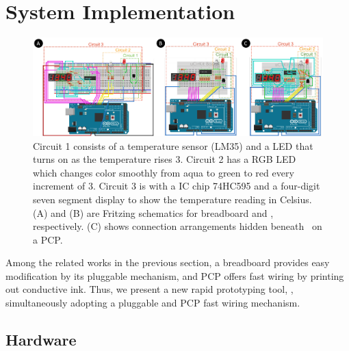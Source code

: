 \section{System Implementation}

\begin{figure}[t]
 \begin{center}
  \includegraphics[width=2\columnwidth]{figures/Fritzing_Schematics_v3.pdf}
  \caption{
    Circuit 1 consists of a temperature sensor (LM35) and a LED that turns on as the temperature rises 3\textcelsius.
    Circuit 2 has a RGB LED which changes color smoothly from aqua to green to red every increment of 3\textcelsius.
    Circuit 3 is with a IC chip 74HC595 and a four-digit seven segment display  to show the temperature reading in Celsius.
    (A) and (B) are Fritzing schematics for breadboard and \papertitle, respectively. (C) shows connection arrangements hidden beneath \papertitle\ on a PCP.
  }
  \label{fig:Chosen_Circuits}
  \end{center}
\end{figure}


Among the related works in the previous section, a breadboard provides easy modification by its pluggable mechanism, and PCP offers fast wiring by printing out conductive ink. Thus, we present a new rapid prototyping tool, \papertitle, simultaneously adopting a pluggable and PCP fast wiring mechanism.

\subsection{Hardware}

